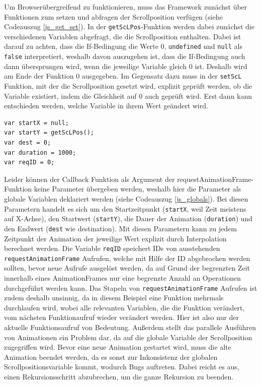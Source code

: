 Um Browserübergreifend zu funktionieren, muss das Framework zunächst über Funktionen zum setzen und abfragen der Scrollposition verfügen (siehe Codeauszug \ref{js_get_set}). In der \lstinline{getScLPos}-Funktion werden dabei zunächst die verschiedenen Variablen abgefragt, die die Scrollposition enthalten. Dabei ist darauf zu achten, dass die If-Bedingung die Werte 0, \lstinline{undefined} und \lstinline{null} als \lstinline{false} interpretiert, weshalb davon auszugehen ist, dass die If-Bedingung auch dann übersprungen wird, wenn die jeweilige Variable gleich 0 ist. Deshalb wird am Ende der Funktion 0 ausgegeben. Im Gegensatz dazu muss in der \lstinline{setScL} Funktion, mit der die Scrollposition gesetzt wird, explizit geprüft werden, ob die Variable existiert, indem die Gleichheit auf 0 auch geprüft wird. Erst dann kann entschieden werden, welche Variable in ihrem Wert geändert wird.

\begin{lstlisting}[caption=Globale Variablen des Animationsframework., label=js_globals]
var startX = null;
var startY = getScLPos();
var dest = 0;
var duration = 1000;
var reqID = 0;
\end{lstlisting}


Leider können der Callback Funktion als Argument der requestAnimationFrame-Funktion keine Parameter übergeben werden, weshalb hier die Parameter als globale Variablen deklariert werden (siehe Codeauszug \ref{js_globals}). Bei diesen Parametern handelt es sich um den Startzeitpunkt (\lstinline{startX}, weil Zeit meistens auf X-Achse), den Startwert (\lstinline{startY}), die Dauer der Animation (\lstinline{duration}) und den Endwert (\lstinline{dest} wie destination). Mit diesen Parametern kann zu jedem Zeitpunkt der Animation der jeweilige Wert explizit durch Interpolation berechnet werden. Die Variable \lstinline{reqID} speichert IDs von ausstehenden \lstinline{requestAnimationFrame} Aufrufen, welche mit Hilfe der ID abgebrochen werden sollten, bevor neue Aufrufe ausgelöst werden, da auf Grund der begrenzten Zeit innerhalb eines AnimationFrames nur eine begrenzte Anzahl an Operationen durchgeführt werden kann. Das Stapeln von \lstinline{requestAnimationFrame} Aufrufen ist zudem deshalb unsinnig, da in diesem Beispiel eine Funktion mehrmals durchlaufen wird, wobei alle relevanten Variablen, die die Funktion verändert, vom nächsten Funktionaufruf wieder verändert werden. Hier ist also nur der aktuelle Funktionsaufruf von Bedeutung. Außerdem stellt das parallele Ausführen von Animationen ein Problem dar, da auf die globale Variable der Scrollposition zugegriffen wird. Bevor eine neue Animation gestartet wird, muss die alte Animation beendet werden, da es sonst zur Inkonsistenz der globalen Scrollpositionsvariable kommt, wodurch Bugs auftreten. Dabei reicht es aus, einen Rekursionsschritt abzubrechen, um die ganze Rekursion zu beenden.

